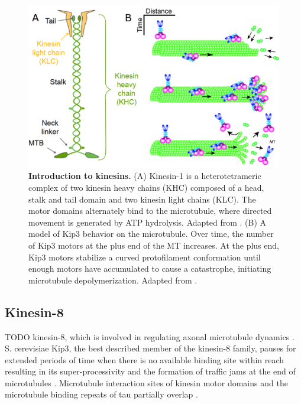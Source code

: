 \begin{figure}[h!tb]
\centering
\includegraphics[scale=0.3]{Figures/kinesins.png}
\caption[Introduction to kinesins.]{\textbf{Introduction to kinesins.}
(A) Kinesin-1 is a heterotetrameric complex of two kinesin heavy chains (KHC) composed of a head, stalk and tail domain and two kinesin light chains (KLC). The motor domains alternately bind to the microtubule, where directed movement is generated by ATP hydrolysis. Adapted from \cite{kawaguchi}. (B) A model of Kip3 behavior on the microtubule. Over time, the number of Kip3 motors at the plus end of the MT increases. At the plus end, Kip3 motors stabilize a curved protofilament conformation until enough motors have accumulated to cause a catastrophe, initiating microtubule depolymerization. Adapted from \cite{weaver}.
	}\label{kinesins}
\end{figure}

\subsection{Kinesin-8}
\label{sec:kip3}
TODO kinesin-8, which is involved in regulating axonal microtubule dynamics \parencite{KEVENAAR2016849}. S. cerevisiae Kip3, the best described member of the kinesin-8 family, pauses for extended periods of time when there is no available binding site within reach \parencite{Varga2009} resulting in its super-processivity \parencite{Varga2006} and the formation of traffic jams at the end of microtubules \parencite{Leduc2012}. Microtubule interaction sites of kinesin motor domains and the microtubule binding repeats of tau partially overlap \parencite{Kellogg2018}. 

